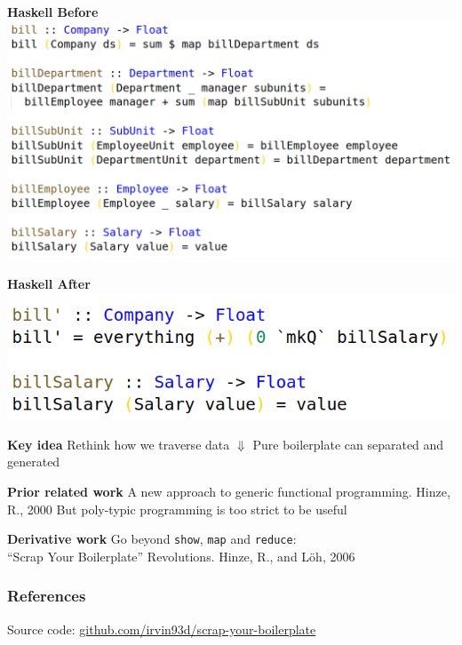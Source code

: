 \documentclass[14pt]{beamer}
\begin{document}
\begin{frame}
  \centering\textbf{Haskell Before}
  \vfill
  \includegraphics[height=0.8\textheight,width=\textwidth,keepaspectratio]{graphics/bill-naive-hs.png}
  \vfill
\end{frame}

\begin{frame}
  \centering\textbf{Haskell After}
  \vfill
  \includegraphics[height=0.8\textheight,width=\textwidth,keepaspectratio]{graphics/bill-hs.png}
  \vfill
\end{frame}

\begin{frame}
  \vfill
  \centering\textbf{Key idea}
  \vfill
  \centering
  Rethink how we traverse data
  \vfill
  $\Downarrow$
  \vfill
  Pure boilerplate can separated and generated
  \vfill
\end{frame}

\begin{frame}
  \centering\textbf{Prior related work}
  \vfill
  A new approach to generic functional programming. Hinze, R., 2000 \cite{hinze2000new}
  \vfill
  \small{But poly-typic programming is too strict to be useful}
  \vfill
\end{frame}

\begin{frame}
  \centering\textbf{Derivative work}
  \vfill
  Go beyond \texttt{show}, \texttt{map} and \texttt{reduce}:\\
  \vfill
  ``Scrap Your Boilerplate'' Revolutions. Hinze, R., and L\"{o}h, 2006 \cite{hinze2006scrap}
  \vfill
\end{frame}

\begin{frame}[fragile]\frametitle{References}
  
  \small{Source code: \href{https://github.com/irvin93d/scrap-your-boilerplate}{github.com/irvin93d/scrap-your-boilerplate}}
\end{frame}
\end{document}
